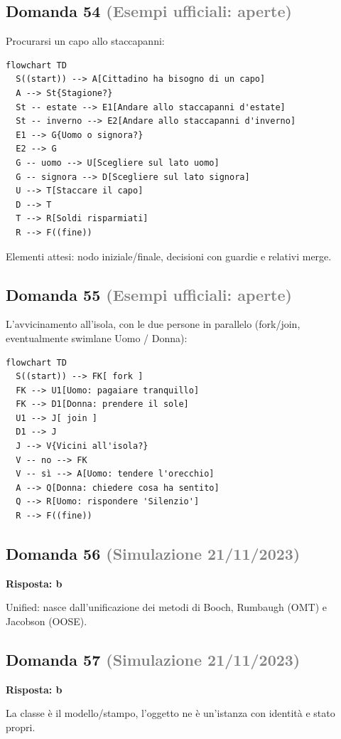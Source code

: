 \documentclass[a4paper,11pt]{article}
\begin{document}
\subsection*{Domanda 54 \hfill {\small \textcolor{gray}{(Esempi ufficiali: aperte)}}}
Procurarsi un capo allo staccapanni:

\begin{verbatim}
flowchart TD
  S((start)) --> A[Cittadino ha bisogno di un capo]
  A --> St{Stagione?}
  St -- estate --> E1[Andare allo staccapanni d'estate]
  St -- inverno --> E2[Andare allo staccapanni d'inverno]
  E1 --> G{Uomo o signora?}
  E2 --> G
  G -- uomo --> U[Scegliere sul lato uomo]
  G -- signora --> D[Scegliere sul lato signora]
  U --> T[Staccare il capo]
  D --> T
  T --> R[Soldi risparmiati]
  R --> F((fine))
\end{verbatim}
Elementi attesi: nodo iniziale/finale, decisioni con guardie e relativi merge.



\subsection*{Domanda 55 \hfill {\small \textcolor{gray}{(Esempi ufficiali: aperte)}}}
L'avvicinamento all'isola, con le due persone in parallelo (fork/join, eventualmente swimlane Uomo / Donna):

\begin{verbatim}
flowchart TD
  S((start)) --> FK[ fork ]
  FK --> U1[Uomo: pagaiare tranquillo]
  FK --> D1[Donna: prendere il sole]
  U1 --> J[ join ]
  D1 --> J
  J --> V{Vicini all'isola?}
  V -- no --> FK
  V -- sì --> A[Uomo: tendere l'orecchio]
  A --> Q[Donna: chiedere cosa ha sentito]
  Q --> R[Uomo: rispondere 'Silenzio']
  R --> F((fine))
\end{verbatim}




\subsection*{Domanda 56 \hfill {\small \textcolor{gray}{(Simulazione 21/11/2023)}}}
\textbf{Risposta: b}\par
Unified: nasce dall'unificazione dei metodi di Booch, Rumbaugh (OMT) e Jacobson (OOSE).



\subsection*{Domanda 57 \hfill {\small \textcolor{gray}{(Simulazione 21/11/2023)}}}
\textbf{Risposta: b}\par
La classe è il modello/stampo, l'oggetto ne è un'istanza con identità e stato propri.
\end{document}

